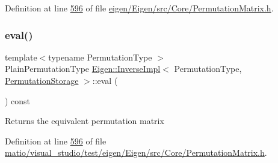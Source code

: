 Definition at line \hyperlink{eigen_2_eigen_2src_2_core_2_permutation_matrix_8h_source_l00596}{596} of file \hyperlink{eigen_2_eigen_2src_2_core_2_permutation_matrix_8h_source}{eigen/\+Eigen/src/\+Core/\+Permutation\+Matrix.\+h}.

\mbox{\label{class_eigen_1_1_inverse_impl_3_01_permutation_type_00_01_permutation_storage_01_4_a9048319f60dc98831ddfd25a5f7d69a7}} 
\subsubsection{\texorpdfstring{eval()}{eval()}\hspace{0.1cm}{\footnotesize\ttfamily [2/2]}}
{\footnotesize\ttfamily template$<$typename Permutation\+Type $>$ \\
Plain\+Permutation\+Type \hyperlink{class_eigen_1_1_inverse_impl}{Eigen\+::\+Inverse\+Impl}$<$ Permutation\+Type, \hyperlink{struct_eigen_1_1_permutation_storage}{Permutation\+Storage} $>$\+::eval (\begin{DoxyParamCaption}{ }\end{DoxyParamCaption}) const\hspace{0.3cm}{\ttfamily [inline]}}

\begin{DoxyReturn}{Returns}
the equivalent permutation matrix 
\end{DoxyReturn}


Definition at line \hyperlink{matio_2visual__studio_2test_2eigen_2_eigen_2src_2_core_2_permutation_matrix_8h_source_l00596}{596} of file \hyperlink{matio_2visual__studio_2test_2eigen_2_eigen_2src_2_core_2_permutation_matrix_8h_source}{matio/visual\+\_\+studio/test/eigen/\+Eigen/src/\+Core/\+Permutation\+Matrix.\+h}.

\mbox{\label{class_eigen_1_1_inverse_impl_3_01_permutation_type_00_01_permutation_storage_01_4_abf863c3bf5bde58cead077f335bfff3a}} 
